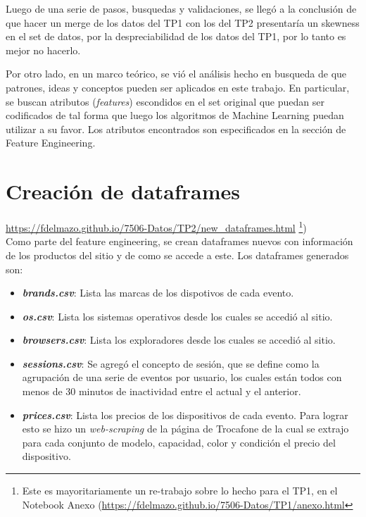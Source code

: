 \documentclass[a4paper]{article}
\begin{document}
Luego de una serie de pasos, busquedas y validaciones, se llegó a la conclusión de que hacer un merge de los datos del TP1 con los del TP2 presentaría un skewness en el set de datos, por la despreciabilidad de los datos del TP1, por lo tanto es mejor no hacerlo.

Por otro lado, en un marco teórico, se vió el análisis hecho en busqueda de que patrones, ideas y conceptos pueden ser aplicados en este trabajo. En particular, se buscan atributos (\textit{features}) escondidos en el set original que puedan ser codificados de tal forma que luego los algoritmos de Machine Learning puedan utilizar a su favor. Los atributos encontrados son especificados en la sección de Feature Engineering.

\section{Creación de dataframes}

\url{https://fdelmazo.github.io/7506-Datos/TP2/new_dataframes.html} \footnote{Este es mayoritariamente un re-trabajo sobre lo hecho para el TP1, en el Notebook Anexo (\url{https://fdelmazo.github.io/7506-Datos/TP1/anexo.html}})\\

Como parte del feature engineering, se crean dataframes nuevos con información de los productos del sitio y de como se accede a este. Los dataframes generados son:

\begin{itemize}
	\item \textbf\textit{{brands.csv}}: Lista las marcas de los dispotivos de cada evento.
	\item \textbf\textit{{os.csv}}: Lista los sistemas operativos desde los cuales se accedió al sitio.
	\item \textbf\textit{{browsers.csv}}: Lista los exploradores desde los cuales se accedió al sitio.
	\item \textbf\textit{{sessions.csv}}:  Se agregó el concepto de sesión, que se define como la agrupación de una serie de eventos por usuario, los cuales están todos con menos de 30 minutos de inactividad entre el actual y el anterior. 
	\item \textbf\textit{{prices.csv}}: Lista los precios de los dispositivos de cada evento. Para lograr esto se hizo un \textit{web-scraping} de la página de Trocafone de la cual se extrajo para cada conjunto de modelo, capacidad, color y condición el precio del dispositivo.
\end{itemize}
\end{document}
